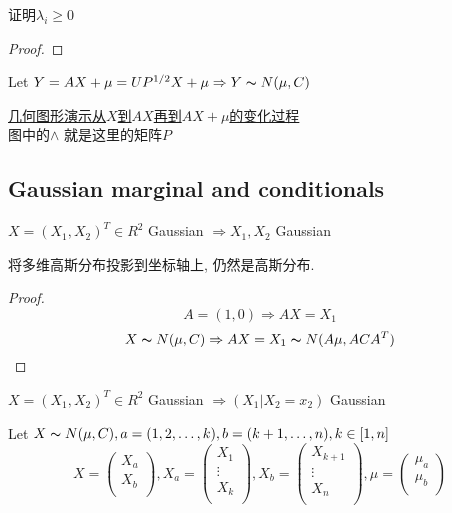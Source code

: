 \documentclass{article}
\begin{document}
证明$\lambda_i \geq 0$
\begin{proof}
\end{proof}

Let $Y = A X + \mu = U P^{1/2} X + \mu \Rightarrow Y \thicksim{N}(\mu, C)$

\href{http://i.imgbox.com/9t3eUww4.png}{几何图形演示从$X$到$AX$再到$AX+\mu$的变化过程}\\
图中的$\wedge$ 就是这里的矩阵$P$

\subsection{Gaussian marginal and conditionals}
\begin{theorem}
$X = (X_1, X_2)^T \in R^2$ Gaussian $\Rightarrow X_1, X_2$ Gaussian
\end{theorem}
将多维高斯分布投影到坐标轴上, 仍然是高斯分布.
\begin{proof}
$$A = (1, 0) \Rightarrow AX = X_1$$
$$X \thicksim{N}(\mu, C) \Rightarrow AX = X_1 \thicksim{N}(A\mu, ACA^T)$$
\end{proof}

\begin{theorem}
$X = (X_1, X_2)^T \in R^2$ Gaussian $\Rightarrow (X_1 | X_2 = x_2)$ Gaussian
\end{theorem}

\bigskip
Let $X \thicksim{N}(\mu, C), a = (1,2,\ldots, k), b = (k+1, \ldots, n), k \in [1,n]$\\
$$
X =
\begin{pmatrix}
    X_a \\
    X_b \\
\end{pmatrix}
,
X_a =
\begin{pmatrix}
    X_1 \\
    \vdots \\
    X_k \\
\end{pmatrix}
,
X_b =
\begin{pmatrix}
  X_{k+1} \\
  \vdots \\
  X_n \\
\end{pmatrix}
,
\mu =
\begin{pmatrix}
  \mu_a \\
  \mu_b \\
\end{pmatrix}
$$
\end{document}
